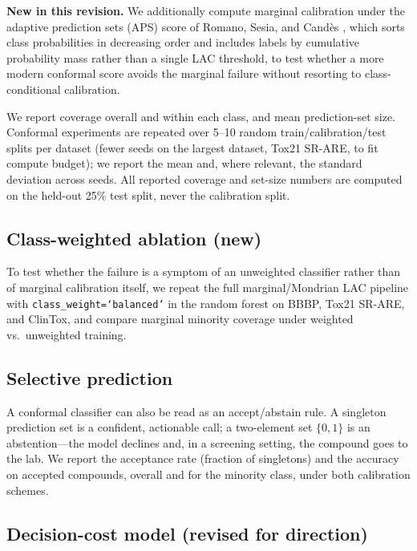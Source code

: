 \documentclass[11pt]{article}
\begin{document}
\textbf{New in this revision.} We additionally compute marginal calibration under the adaptive
prediction sets (APS) score of Romano, Sesia, and Cand\`es \cite{romano2020}, which sorts class
probabilities in decreasing order and includes labels by cumulative probability mass rather than a
single LAC threshold, to test whether a more modern conformal score avoids the marginal failure
without resorting to class-conditional calibration.

We report coverage overall and within each class, and mean prediction-set size. Conformal
experiments are repeated over 5--10 random train/calibration/test splits per dataset (fewer seeds
on the largest dataset, Tox21 SR-ARE, to fit compute budget); we report the mean and, where
relevant, the standard deviation across seeds. All reported coverage and set-size numbers are
computed on the held-out 25\% test split, never the calibration split.

\subsection{Class-weighted ablation (new)}

To test whether the failure is a symptom of an unweighted classifier rather than of marginal
calibration itself, we repeat the full marginal/Mondrian LAC pipeline with
\texttt{class\_weight=`balanced'} in the random forest on BBBP, Tox21 SR-ARE, and ClinTox, and
compare marginal minority coverage under weighted vs.\ unweighted training.

\subsection{Selective prediction}

A conformal classifier can also be read as an accept/abstain rule. A singleton prediction set is a
confident, actionable call; a two-element set $\{0,1\}$ is an abstention---the model declines and,
in a screening setting, the compound goes to the lab. We report the acceptance rate (fraction of
singletons) and the accuracy on accepted compounds, overall and for the minority class, under both
calibration schemes.

\subsection{Decision-cost model (revised for direction)}
\end{document}
